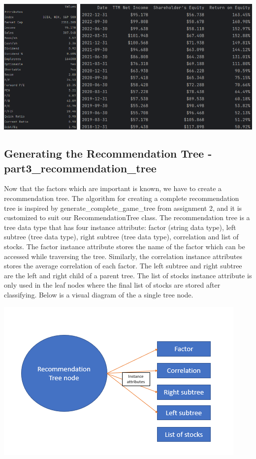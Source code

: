 \documentclass[fontsize=11pt]{article}
\begin{document}
\begin{center}
\includegraphics[scale=0.5]{dataset.png}
\end{center}

\subsection{Generating the Recommendation Tree - part3\_recommendation\_tree}
Now that the factors which are important is known, we have to create a recommendation tree. The algorithm for creating a complete recommendation tree is inspired by generate\_complete\_game\_tree from assignment 2, and it is customized to suit our RecommendationTree class. The recommendation tree is a tree data type that has four instance attribute: factor (string data type), left subtree (tree data type), right subtree (tree data type), correlation and list of stocks. The factor instance attribute stores the name of the factor which can be accessed while traversing the tree. Similarly, the correlation instance attributes stores the average correlation of each factor. The left subtree and right subtree are the left and right child of a parent tree. The list of stocks instance attribute is only used in the leaf nodes where the final list of stocks are stored after classifying. Below is a visual diagram of the a single tree node.\\

\begin{center}
\includegraphics{tree_node.png}
\end{center}
\end{document}
